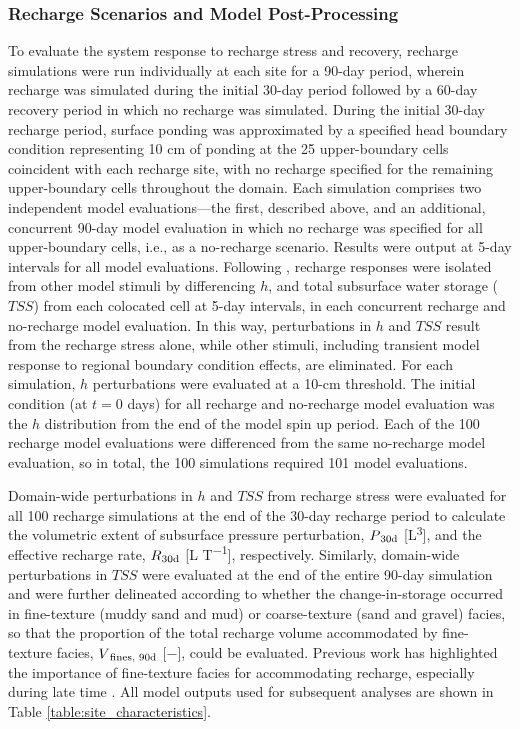 \subsubsection{Recharge Scenarios and Model Post-Processing} \label{sssec:MM_rech_scenarios_post_processing}
To evaluate the system response to recharge stress and recovery, recharge simulations were run individually at each site for a 90-day period, wherein recharge was simulated during the initial 30-day period followed by a 60-day recovery period in which no recharge was simulated. During the initial 30-day recharge period, surface ponding was approximated by a specified head boundary condition representing 10 cm of ponding at the 25 upper-boundary cells coincident with each recharge site, with no recharge specified for the remaining upper-boundary cells throughout the domain. Each simulation comprises two independent model evaluations---the first, described above, and an additional, concurrent 90-day model evaluation in which no recharge was specified for all upper-boundary cells, i.e., as a no-recharge scenario.  Results were output at 5-day intervals for all model evaluations. Following \cite{maples_2019}, recharge responses were isolated from other model stimuli by differencing $h$, and total subsurface water storage ($TSS$) from each colocated cell at 5-day intervals, in each concurrent recharge and no-recharge model evaluation. In this way, perturbations in $h$ and $TSS$ result from the recharge stress alone, while other stimuli, including transient model response to regional boundary condition effects, are eliminated. For each simulation, $h$ perturbations were evaluated at a 10-cm threshold. The initial condition (at $t=0$ days) for all recharge and no-recharge model evaluation was the $h$ distribution from the end of the model spin up period. Each of the 100 recharge model evaluations were differenced from the same no-recharge model evaluation, so in total, the 100 simulations required 101 model evaluations. 

Domain-wide perturbations in $h$ and $TSS$ from recharge stress were evaluated for all 100 recharge simulations at the end of the 30-day recharge period to calculate the volumetric extent of subsurface pressure perturbation, $P\textsubscript{30d}$ [L\textsuperscript{$3$}], and the effective recharge rate, $R\textsubscript{30d}$ [L T\textsuperscript{$-1$}], respectively. Similarly, domain-wide perturbations in $TSS$ were evaluated at the end of the entire 90-day simulation and were further delineated according to whether the change-in-storage occurred in fine-texture (muddy sand and mud) or coarse-texture (sand and gravel) facies, so that the proportion of the total recharge volume accommodated by fine-texture facies, $V\textsubscript{fines, 90d}$ [$-$], could be evaluated. Previous work has highlighted the importance of fine-texture facies for accommodating recharge, especially during late time \citep[e.g.,][]{maples_2019}. All model outputs used for subsequent analyses are shown in Table \ref{table:site_characteristics}.

